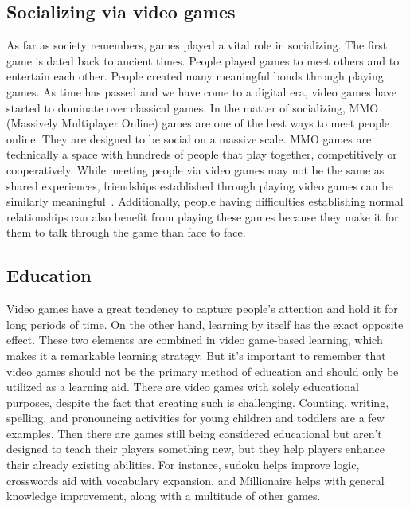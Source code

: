 \documentclass[10pt,twoside,english,a4paper]{article}
\begin{document}
\subsection{Socializing via video games}
As far as society remembers, games played a vital role in socializing. The first game is dated back to ancient times. People played games to meet others and to entertain each other. People created many meaningful bonds through playing games. As time has passed and we have come to a digital era, video games have started to dominate over classical games. In the matter of socializing, MMO (Massively Multiplayer Online) games are one of the best ways to meet people online. They are designed to be social on a massive scale. MMO games are technically a space with hundreds of people that play together, competitively or cooperatively. While meeting people via video games may not be the same as shared experiences, friendships established through playing video games can be similarly meaningful~\cite{poz-neg-sol}. Additionally, people having difficulties establishing normal relationships can also benefit from playing these games because they make it for them to talk through the game than face to face.

\subsection{Education}
Video games have a great tendency to capture people's attention and hold it for long periods of time. On the other hand, learning by itself has the exact opposite effect. These two elements are combined in video game-based learning, which makes it a remarkable learning strategy. But it's important to remember that video games should not be the primary method of education and should only be utilized as a learning aid. There are video games with solely educational purposes, despite the fact that creating such is challenging. Counting, writing, spelling, and pronouncing activities for young children and toddlers are a few examples. Then there are games still being considered educational but aren't designed to teach their players something new, but they help players enhance their already existing abilities. For instance, sudoku helps improve logic, crosswords aid with vocabulary expansion, and Millionaire helps with general knowledge improvement, along with a multitude of other games.~\cite{learning}
\end{document}
